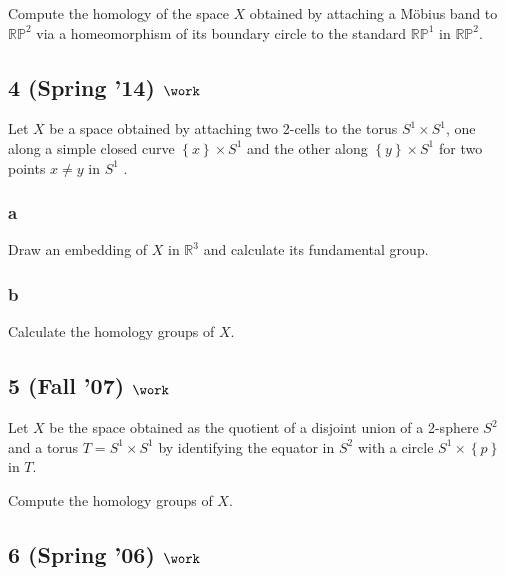 Compute the homology of the space \(X\) obtained by attaching a Möbius
band to \({\mathbb{RP}}^2\) via a homeomorphism of its boundary circle
to the standard \({\mathbb{RP}}^1\) in \({\mathbb{RP}}^2\).

\hypertarget{spring-14-work}{%
\subsection{\texorpdfstring{4 (Spring '14)
\(\work\)}{4 (Spring '14) \textbackslash work}}\label{spring-14-work}}

Let \(X\) be a space obtained by attaching two 2-cells to the torus
\(S^1 \times S^1\), one along a simple closed curve
\(\left\{{x}\right\} \times S^1\) and the other along
\(\left\{{y}\right\} \times S^1\) for two points \(x \neq y\) in \(S^1\)
.

\hypertarget{a-17}{%
\subsubsection{a}\label{a-17}}

Draw an embedding of \(X\) in \({\mathbb{R}}^3\) and calculate its
fundamental group.

\hypertarget{b-17}{%
\subsubsection{b}\label{b-17}}

Calculate the homology groups of \(X\).

\hypertarget{fall-07-work-1}{%
\subsection{\texorpdfstring{5 (Fall '07)
\(\work\)}{5 (Fall '07) \textbackslash work}}\label{fall-07-work-1}}

Let \(X\) be the space obtained as the quotient of a disjoint union of a
2-sphere \(S^2\) and a torus \(T = S^1 \times S^1\) by identifying the
equator in \(S^2\) with a circle \(S^1 \times \left\{{p}\right\}\) in
\(T\).

Compute the homology groups of \(X\).

\hypertarget{spring-06-work-4}{%
\subsection{\texorpdfstring{6 (Spring '06)
\(\work\)}{6 (Spring '06) \textbackslash work}}\label{spring-06-work-4}}

